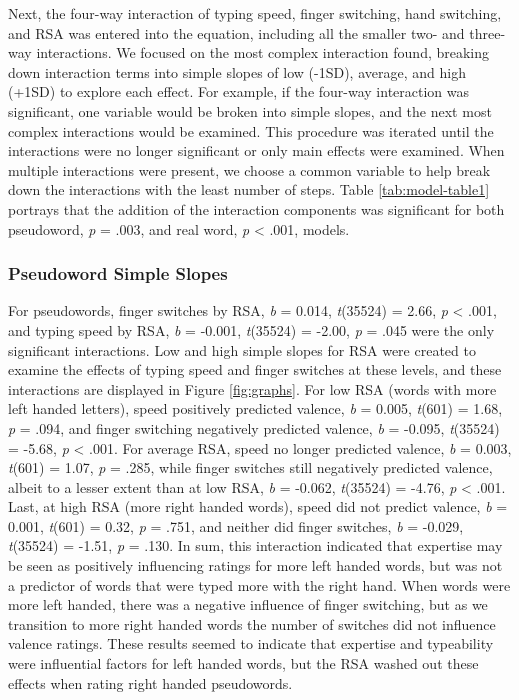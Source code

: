 \documentclass[
  english,
  man,mask]{apa7}
\begin{document}
Next, the four-way interaction of typing speed, finger switching, hand switching, and RSA was entered into the equation, including all the smaller two- and three-way interactions. We focused on the most complex interaction found, breaking down interaction terms into simple slopes of low (-1SD), average, and high (+1SD) to explore each effect. For example, if the four-way interaction was significant, one variable would be broken into simple slopes, and the next most complex interactions would be examined. This procedure was iterated until the interactions were no longer significant or only main effects were examined. When multiple interactions were present, we choose a common variable to help break down the interactions with the least number of steps. Table \ref{tab:model-table1} portrays that the addition of the interaction components was significant for both pseudoword, \emph{p} = .003, and real word, \emph{p} \textless{} .001, models.

\hypertarget{pseudoword-simple-slopes}{%
\subsubsection{Pseudoword Simple Slopes}\label{pseudoword-simple-slopes}}

For pseudowords, finger switches by RSA, \emph{b} = 0.014, \emph{t}(35524) = 2.66, \emph{p} \textless{} .001, and typing speed by RSA, \emph{b} = -0.001, \emph{t}(35524) = -2.00, \emph{p} = .045 were the only significant interactions. Low and high simple slopes for RSA were created to examine the effects of typing speed and finger switches at these levels, and these interactions are displayed in Figure \ref{fig:graphs}. For low RSA (words with more left handed letters), speed positively predicted valence, \emph{b} = 0.005, \emph{t}(601) = 1.68, \emph{p} = .094, and finger switching negatively predicted valence, \emph{b} = -0.095, \emph{t}(35524) = -5.68, \emph{p} \textless{} .001. For average RSA, speed no longer predicted valence, \emph{b} = 0.003, \emph{t}(601) = 1.07, \emph{p} = .285, while finger switches still negatively predicted valence, albeit to a lesser extent than at low RSA, \emph{b} = -0.062, \emph{t}(35524) = -4.76, \emph{p} \textless{} .001. Last, at high RSA (more right handed words), speed did not predict valence, \emph{b} = 0.001, \emph{t}(601) = 0.32, \emph{p} = .751, and neither did finger switches, \emph{b} = -0.029, \emph{t}(35524) = -1.51, \emph{p} = .130. In sum, this interaction indicated that expertise may be seen as positively influencing ratings for more left handed words, but was not a predictor of words that were typed more with the right hand. When words were more left handed, there was a negative influence of finger switching, but as we transition to more right handed words the number of switches did not influence valence ratings. These results seemed to indicate that expertise and typeability were influential factors for left handed words, but the RSA washed out these effects when rating right handed pseudowords.
\end{document}
